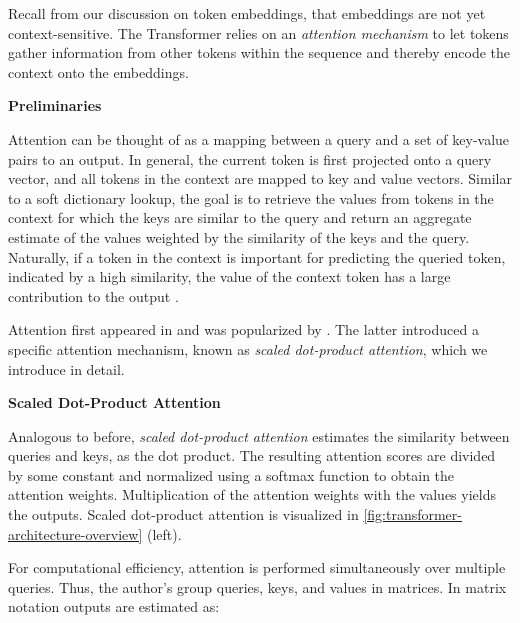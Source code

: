 Recall from our discussion on token embeddings, that embeddings are not yet context-sensitive. The Transformer relies on an \emph{attention mechanism} to let tokens gather information from other tokens within the sequence and thereby encode the context onto the embeddings.

\textbf{Preliminaries}

Attention can be thought of as a mapping between a query and a set of key-value pairs to an output. In general, the current token is first projected onto a query vector, and all tokens in the context are mapped to key and value vectors. Similar to a soft dictionary lookup, the goal is to retrieve the values from tokens in the context for which the keys are similar to the query and return an aggregate estimate of the values weighted by the similarity of the keys and the query. Naturally, if a token in the context is important for predicting the queried token, indicated by a high similarity, the value of the context token has a large contribution to the output \autocites[][5]{phuongFormalAlgorithmsTransformers2022}[][6003]{vaswaniAttentionAllYou2017}.

Attention first appeared in \textcite[][4]{bahdanauNeuralMachineTranslation2016} and was popularized by \textcite[][6004]{vaswaniAttentionAllYou2017}. The latter introduced a specific attention mechanism, known as \emph{scaled dot-product attention}, which we introduce in detail.

\textbf{Scaled Dot-Product Attention}

Analogous to before, \emph{scaled dot-product attention} estimates the similarity between queries and keys, as the dot product. The resulting attention scores are divided by some constant and normalized using a softmax function to obtain the attention weights. Multiplication of the attention weights with the values yields the outputs. Scaled dot-product attention is visualized in \cref{fig:transformer-architecture-overview} (left).

For computational efficiency, attention is performed simultaneously over multiple queries. Thus, the author's group queries, keys, and values in matrices. In matrix notation outputs are estimated as:

